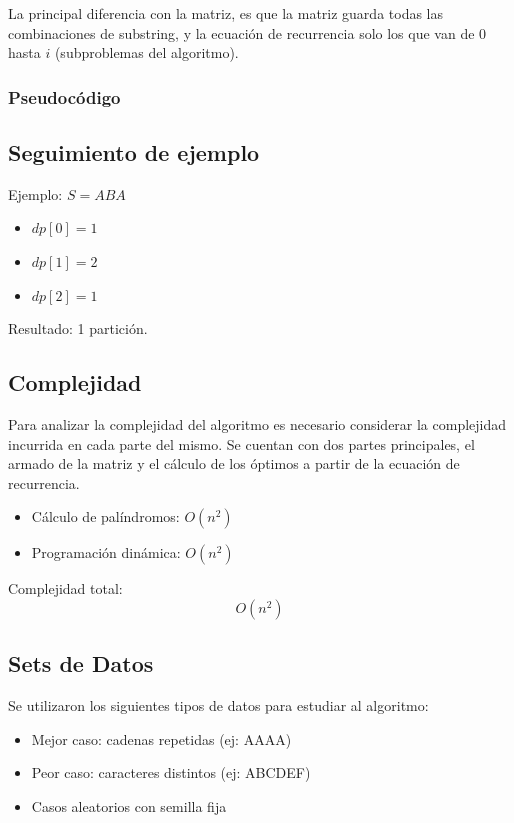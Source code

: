 La principal diferencia con la matriz, es que la matriz guarda todas las combinaciones de substring, y la ecuación de recurrencia solo los que van 
de $0$ hasta $i$ (subproblemas del algoritmo).

\subsubsection{Pseudocódigo}



\subsection{Seguimiento de ejemplo}

Ejemplo: $S = ABA$

\begin{itemize}
    \item $dp[0] = 1$
    \item $dp[1] = 2$
    \item $dp[2] = 1$
\end{itemize}

Resultado: 1 partición.

\subsection{Complejidad}

Para analizar la complejidad del algoritmo es necesario considerar la complejidad incurrida en cada parte del mismo. Se cuentan con dos partes
principales, el armado de la matriz y el cálculo de los óptimos a partir de la ecuación de recurrencia.

\begin{itemize}
    \item Cálculo de palíndromos: $O(n^2)$
    \item Programación dinámica: $O(n^2)$
\end{itemize}

Complejidad total:
\[
O(n^2)
\]

\subsection{Sets de Datos}

Se utilizaron los siguientes tipos de datos para estudiar al algoritmo:

\begin{itemize}
    \item Mejor caso: cadenas repetidas (ej: AAAA)
    \item Peor caso: caracteres distintos (ej: ABCDEF)
    \item Casos aleatorios con semilla fija
\end{itemize}

